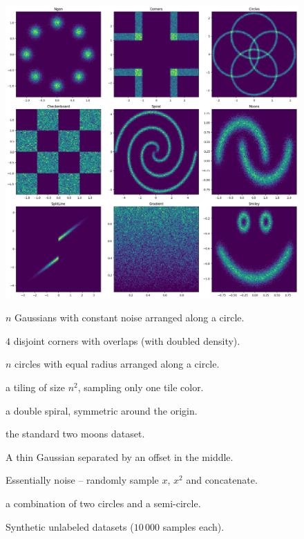 \begin{figure}
{\centering%
\includegraphics[width=\textwidth]{images/synthetic/overview/synt-nolab.png}
\caption{Synthetic unlabeled datasets ($10\,000$ samples each).}\label{fig:synt-nolab}}

\vspace{2em}

 $n$ Gaussians with constant noise arranged along a circle.

 $4$ disjoint corners with overlaps (with doubled density).

 $n$ circles with equal radius arranged along a circle.

 a tiling of size $n^2$, sampling only one tile color.

 a double spiral, symmetric around the origin.

 the standard two moons dataset.

 A thin Gaussian separated by an offset in the middle.

 Essentially noise -- randomly sample $x$, $x^2$ and concatenate.

 a combination of two circles and a semi-circle.
\end{figure}

